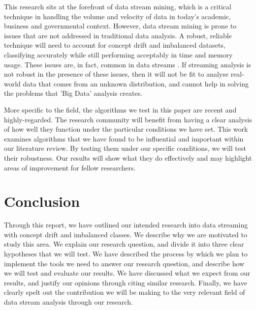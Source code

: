\documentclass[11pt]{article}\usepackage[]{graphicx}\usepackage[]{color}
\begin{document}
This research sits at the forefront of data stream mining, which is a critical technique in handling the volume and velocity of data in today's academic, business and governmental context. However, data stream mining is prone to issues that are not addressed in traditional data analysis. A robust, reliable technique will need to account for concept drift and imbalanced datasets, classifying accurately while still performing acceptably in time and memory usage. These issues are, in fact, common in data streams \cite{wan13}. If streaming analysis is not robust in the presence of these issues, then it will not be fit to analyse real-world data that comes from an unknown distribution, and cannot help in solving the problems that 'Big Data' analysis creates.

More specific to the field, the algorithms we test in this paper are recent and highly-regarded. The research community will benefit from having a clear analysis of how well they function under the particular conditions we have set. This work examines algorithms that we have found to be influential and important within our literature review. By testing them under our specific conditions, we will test their robustness. Our results will show what they do effectively and may highlight areas of improvement for fellow researchers.

\section{Conclusion}

Through this report, we have outlined our intended research into data streaming with concept drift and imbalanced classes. We describe why we are motivated to study this area. We explain our research question, and divide it into three clear hypotheses that we will test. We have described the process by which we plan to implement the tools we need to answer our research question, and describe how we will test and evaluate our results. We have discussed what we expect from our results, and justify our opinions through citing similar research. Finally, we have clearly spelt out the contribution we will be making to the very relevant field of data stream analysis through our research.

\newpage


\end{document}
